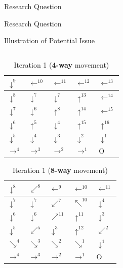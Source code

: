 \documentclass[xcolor=table, 9pt]{beamer}
\begin{document}
\begin{section}{Research Question}
\begin{frame}{Research Question}
\begin{block}{Illustration of Potential Issue}
            \begin{columns}
                \begin{column}{0.5\textwidth}
\begin{table}[]
\begin{tabular}{|l|l|l|l|l|}
\hline
$\downarrow^9$ & $\leftarrow^{10}$ & $\leftarrow^{11}$ & $\leftarrow^{12}$   & $\leftarrow^{13}$ \\
\hline
$\downarrow^8$ & $\downarrow^{7}$  & $\downarrow^{7}$   & $\uparrow^{13}$     & $\leftarrow^{14}$   \\
\hline
$\downarrow^7$ & $\downarrow^{6}$  & $\uparrow^{8}$   & $\uparrow^{14}$     & $\leftarrow^{15}$   \\
\hline
$\downarrow^6$ & $\uparrow^{5}$  & $\downarrow^{4}$   & $\uparrow^{15}$     & $\uparrow^{16}$   \\
\hline
$\downarrow^5$ & $\downarrow^{4}$  & $\downarrow^{3}$  & $\downarrow^{2}$    & $\downarrow^{1}$  \\
\hline
$\rightarrow^4$ & $\rightarrow^3$  & $\rightarrow^2$ & $\rightarrow^1$ & O \\
\hline
\end{tabular}
\caption{Iteration 1 (\textbf{4-way} movement)}
\end{table}

\begin{table}[]
\begin{tabular}{|l|l|l|l|l|}
\hline
$\downarrow^8$ & $\swarrow^{8}$ & $\leftarrow^{9}$ & $\leftarrow^{10}$   & $\leftarrow^{11}$ \\
\hline
$\downarrow^7$ & $\downarrow^{7}$  & $\swarrow^{7}$   & $\nwarrow^{10}$     & $\downarrow^{4}$   \\
\hline
$\downarrow^6$ & $\downarrow^{6}$  & $\nearrow^{11}$   & $\uparrow^{11}$     & $\downarrow^{3}$   \\
\hline
$\downarrow^5$ & $\swarrow^{5}$  & $\downarrow^{3}$   & $\uparrow^{12}$     & $\swarrow^{2}$   \\
\hline
$\searrow^4$ & $\searrow^{3}$  & $\searrow^{2}$  & $\searrow^{1}$    & $\downarrow^{1}$  \\
\hline
$\rightarrow^4$ & $\rightarrow^3$  & $\rightarrow^2$ & $\rightarrow^1$ & O \\
\hline
\end{tabular}
\caption{Iteration 1 (\textbf{8-way} movement)}
\end{table}



\end{column}
\end{columns}
\end{block}
\end{frame}
\end{section}
\end{document}
